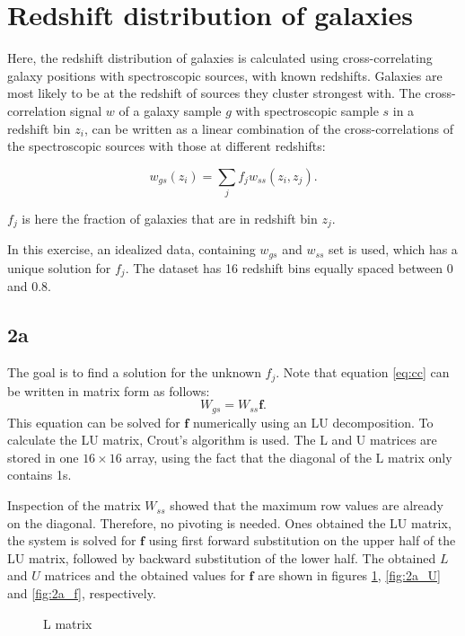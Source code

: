 \section{Redshift distribution of galaxies}
Here, the redshift distribution of galaxies is calculated using cross-correlating galaxy positions with spectroscopic sources, with known redshifts. Galaxies are most likely to be at the redshift of sources they cluster strongest with. The cross-correlation signal $w$ of a galaxy sample $g$ with spectroscopic sample $s$ in a redshift bin $z_i$, can be written as a linear combination of the cross-correlations of the spectroscopic sources with those at different redshifts:

\begin{equation}
    \label{eq:cc}
    w_{gs}(z_i) = \sum_j f_j w_{ss}(z_i, z_j).
\end{equation}

$f_j$ is here the fraction of galaxies that are in redshift bin $z_j$. 

In this exercise, an idealized data, containing $w_{gs}$ and $w_{ss}$ set is used, which has a unique solution for $f_j$. The dataset has 16 redshift bins equally spaced between 0 and 0.8. 

\subsection*{2a}
The goal is to find a solution for the unknown $f_j$. Note that equation \ref{eq:cc} can be written in matrix form as follows:
\begin{equation}
    W_{gs} = W_{ss}\mathbf{f}.
\end{equation}
This equation can be solved for $\mathbf{f}$ numerically using an LU decomposition. To calculate the LU matrix, Crout's algorithm is used. The L and U matrices are stored in one $16 \times 16$ array, using the fact that the diagonal of the L matrix only contains 1s.

Inspection of the matrix $W_{ss}$ showed that the maximum row values are already on the diagonal. Therefore, no pivoting is needed. Ones obtained the LU matrix, the system is solved for $\mathbf{f}$ using first forward substitution on the upper half of the LU matrix, followed by backward substitution of the lower half. The obtained $L$ and $U$ matrices and the obtained values for $\mathbf{f}$ are shown in figures \ref{fig:2a_L}, \ref{fig:2a_U} and \ref{fig:2a_f}, respectively.

\begin{figure}[!ht]
    \centering
    
    \caption{L matrix}
    \label{fig:2a_L}
\end{figure}

